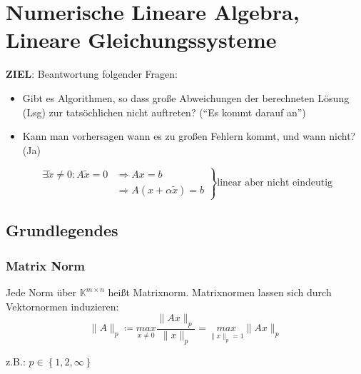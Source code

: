 \section{Numerische Lineare Algebra, Lineare Gleichungssysteme}
\textbf{ZIEL}: Beantwortung folgender Fragen:
\begin{itemize}
\item{Gibt es Algorithmen, so dass große Abweichungen der berechneten Lösung (Lsg) zur tatsöchlichen nicht auftreten? 
  (``Es kommt darauf an'')}
\item{Kann man vorhersagen wann es zu großen Fehlern kommt, und wann nicht? (Ja)}
\end{itemize}

\begin{equation*}
  \left.
    \begin{aligned}
      \exists \widetilde{x} \neq 0: A\widetilde{x} = 0 & \Rightarrow  Ax = b \\
        & \Rightarrow A(x + \alpha \widetilde{x}) = b
    \end{aligned}
  \right\}
  \text{linear aber nicht eindeutig} %
\end{equation*}

\subsection{Grundlegendes}

\subsubsection{Matrix Norm}

Jede Norm über $\mathbb{K}^{m \times n}$ heißt Matrixnorm.
Matrixnormen lassen sich durch Vektornormen induzieren:
\begin{equation*}
\|A\|_p \coloneqq \underset{x \neq 0}{max} \frac{\|Ax\|_p}{\|x\|_p} = \underset{\|x\|_p = 1}{max}\|Ax\|_p
\end{equation*}

z.B.: $p \in \left\{1, 2, \infty \right\}$

